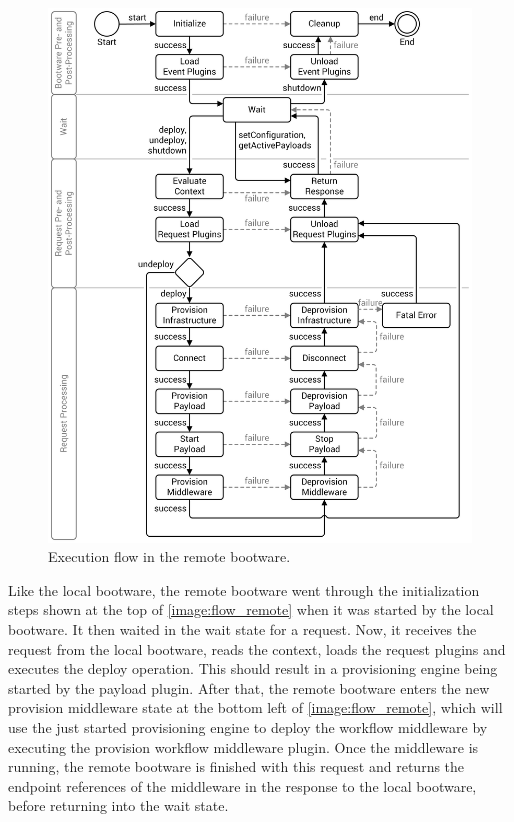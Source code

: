 \begin{figure}[!htbp]
	\centering
	\includegraphics[resolution=600]{design/assets/flow_remote}
	\caption{Execution flow in the remote bootware.}
	\label{image:flow_remote}
\end{figure}

Like the local bootware, the remote bootware went through the initialization steps shown at the top of \autoref{image:flow_remote} when it was started by the local bootware.
It then waited in the wait state for a request.
Now, it receives the request from the local bootware, reads the context, loads the request plugins and executes the deploy operation.
This should result in a provisioning engine being started by the payload plugin.
After that, the remote bootware enters the new provision middleware state at the bottom left of \autoref{image:flow_remote}, which will use the just started provisioning engine to deploy the workflow middleware by executing the provision workflow middleware plugin.
Once the middleware is running, the remote bootware is finished with this request and returns the endpoint references of the middleware in the response to the local bootware, before returning into the wait state.

